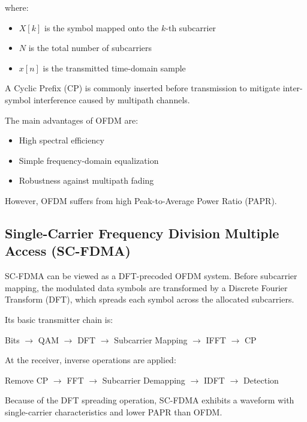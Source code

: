 where:

\begin{itemize}
    \item $X[k]$ is the symbol mapped onto the $k$-th subcarrier
    \item $N$ is the total number of subcarriers
    \item $x[n]$ is the transmitted time-domain sample
\end{itemize}

A Cyclic Prefix (CP) is commonly inserted before transmission to mitigate
inter-symbol interference caused by multipath channels.

The main advantages of OFDM are:

\begin{itemize}
    \item High spectral efficiency
    \item Simple frequency-domain equalization
    \item Robustness against multipath fading
\end{itemize}

However, OFDM suffers from high Peak-to-Average Power Ratio (PAPR).

\subsection{Single-Carrier Frequency Division Multiple Access (SC-FDMA)}

SC-FDMA can be viewed as a DFT-precoded OFDM system. Before subcarrier
mapping, the modulated data symbols are transformed by a Discrete Fourier
Transform (DFT), which spreads each symbol across the allocated
subcarriers.

Its basic transmitter chain is:

\begin{center}
Bits $\rightarrow$ QAM $\rightarrow$ DFT $\rightarrow$
Subcarrier Mapping $\rightarrow$ IFFT $\rightarrow$ CP
\end{center}

At the receiver, inverse operations are applied:

\begin{center}
Remove CP $\rightarrow$ FFT $\rightarrow$
Subcarrier Demapping $\rightarrow$ IDFT $\rightarrow$ Detection
\end{center}

Because of the DFT spreading operation, SC-FDMA exhibits a waveform with
single-carrier characteristics and lower PAPR than OFDM.

